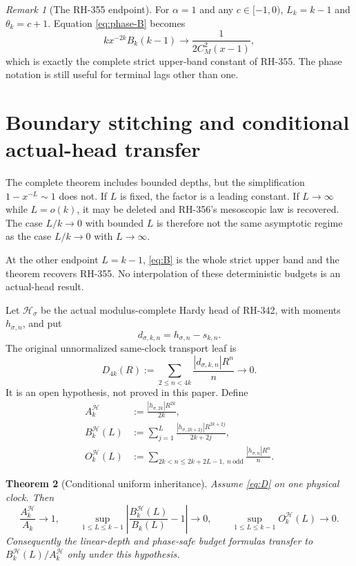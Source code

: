 \documentclass[11pt]{article}
\newtheorem{theorem}{Theorem}[section]
\theoremstyle{remark}
\newtheorem{remark}[theorem]{Remark}
\newcommand{\cH}{\mathcal H}
\begin{document}
\begin{remark}[The RH-355 endpoint]
For $\alpha=1$ and any $c\in[-1,0)$, $L_k=k-1$ and
$\theta_k=c+1$.  Equation \eqref{eq:phase-B} becomes
\[
 kx^{-2k}B_k(k-1)\longrightarrow\frac1{2C_M^2(x-1)},
\]
which is exactly the complete strict upper-band constant of RH-355.  The
phase notation is still useful for terminal lags other than one.
\end{remark}

\section{Boundary stitching and conditional actual-head transfer}

The complete theorem includes bounded depths, but the simplification
$1-x^{-L}\sim1$ does not.  If $L$ is fixed, the factor is a leading constant.
If $L\to\infty$ while $L=o(k)$, it may be deleted and RH-356's mesoscopic
law is recovered.  The case $L/k\to0$ with bounded $L$ is therefore not the
same asymptotic regime as the case $L/k\to0$ with $L\to\infty$.

At the other endpoint $L=k-1$, \eqref{eq:B} is the whole strict upper band and
the theorem recovers RH-355.  No interpolation of these deterministic budgets
is an actual-head result.

Let $\cH_\sigma$ be the actual modulus-complete Hardy head of RH-342, with
moments $h_{\sigma,n}$, and put
\[
 d_{\sigma,k,n}=h_{\sigma,n}-s_{k,n}.
\]
The original unnormalized same-clock transport leaf is
\begin{equation}\label{eq:D}
 D_{4k}(R):=\sum_{2\le n<4k}\frac{|d_{\sigma,k,n}|R^n}{n}\longrightarrow0.
\end{equation}
It is an open hypothesis, not proved in this paper.  Define
\begin{align}
 A_k^{\cH}&:=\frac{|h_{\sigma,2k}|R^{2k}}{2k},\label{eq:AH}\\
 B_k^{\cH}(L)&:=\sum_{j=1}^{L}
 \frac{|h_{\sigma,2k+2j}|R^{2k+2j}}{2k+2j},\label{eq:BH}\\
 O_k^{\cH}(L)&:=\sum_{2k<n\le2k+2L-1,\ n\ \mathrm{odd}}
 \frac{|h_{\sigma,n}|R^n}{n}.
\end{align}

\begin{theorem}[Conditional uniform inheritance]\label{thm:conditional}
Assume \eqref{eq:D} on one physical clock.  Then
\begin{equation}\label{eq:conditional-budgets}
 \frac{A_k^{\cH}}{A_k}\to1,
 \qquad
 \sup_{1\le L\le k-1}
 \left|\frac{B_k^{\cH}(L)}{B_k(L)}-1\right|\to0,
 \qquad
 \sup_{1\le L\le k-1}O_k^{\cH}(L)\to0.
\end{equation}
Consequently the linear-depth and phase-safe budget formulas transfer to
$B_k^{\cH}(L)/A_k^{\cH}$ only under this hypothesis.
\end{theorem}
\end{document}
